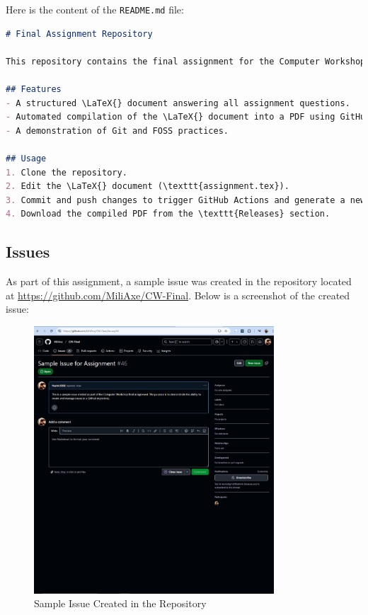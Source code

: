 \documentclass{article}
\begin{document}
Here is the content of the \texttt{README.md} file:
\begin{lstlisting}[language=markdown]
# Final Assignment Repository

This repository contains the final assignment for the Computer Workshop course. It demonstrates skills in Git, \LaTeX{}, GitHub Actions, and more.

## Features
- A structured \LaTeX{} document answering all assignment questions.
- Automated compilation of the \LaTeX{} document into a PDF using GitHub Actions.
- A demonstration of Git and FOSS practices.

## Usage
1. Clone the repository.
2. Edit the \LaTeX{} document (\texttt{assignment.tex}).
3. Commit and push changes to trigger GitHub Actions and generate a new release.
4. Download the compiled PDF from the \texttt{Releases} section.
\end{lstlisting}

\subsection{Issues}
As part of this assignment, a sample issue was created in the repository located at \url{https://github.com/MiliAxe/CW-Final}. Below is a screenshot of the created issue:

\begin{figure}[h!]
 \centering
 \includegraphics[width=0.8\textwidth]{issue_screenshot.png}
 \caption{Sample Issue Created in the Repository}
 \label{fig:issue}
\end{figure}
\end{document}
